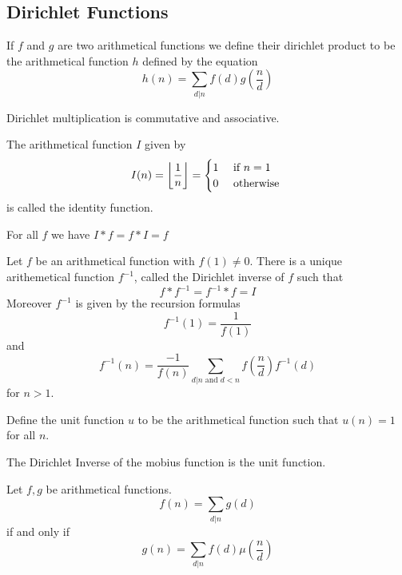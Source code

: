 \documentclass[a4paper]{article}
\begin{document}
\subsection{Dirichlet Functions}
\begin{defn} If $f$ and $g$ are two arithmetical functions we define their dirichlet product to be the arithmetical function $h$ defined by the equation $$h(n)=\sum_{d|n}f(d)g\left(\frac{n}{d}\right)$$
\end{defn}

\begin{thm} Dirichlet multiplication is commutative and associative. 
\end{thm}

\begin{defn} The arithmetical function $I$ given by $$I(n)=\floor*{\frac{1}{n}}=\begin{cases}
1 & \text{ if }n=1\\
0 & \text{ otherwise }
\end{cases}$$ is called the identity function. 
\end{defn}

\begin{prp} For all $f$ we have $I\ast f=f\ast I=f$
\end{prp}

\begin{thm} Let $f$ be an arithmetical function with $f(1)\neq0$. There is a unique arithemetical function $f^{-1}$, called the Dirichlet inverse of $f$ such that $$f\ast f^{-1}=f^{-1}\ast f=I$$ Moreover $f^{-1}$ is given by the recursion formulas $$f^{-1}(1)=\frac{1}{f(1)}$$ and $$f^{-1}(n)=\frac{-1}{f(n)}\sum_{d|n\text{ and }d<n}f\left(\frac{n}{d}\right)f^{-1}(d)$$ for $n>1$. 
\end{thm}

\begin{defn} Define the unit function $u$ to be the arithmetical function such that $u(n)=1$ for all $n$. 
\end{defn}

\begin{prp} The Dirichlet Inverse of the mobius function is the unit function. 
\end{prp}

\begin{thm} Let $f,g$ be arithmetical functions. $$f(n)=\sum_{d|n}g(d)$$ if and only if $$g(n)=\sum_{d|n}f(d)\mu\left(\frac{n}{d}\right)$$
\end{thm}
\end{document}
